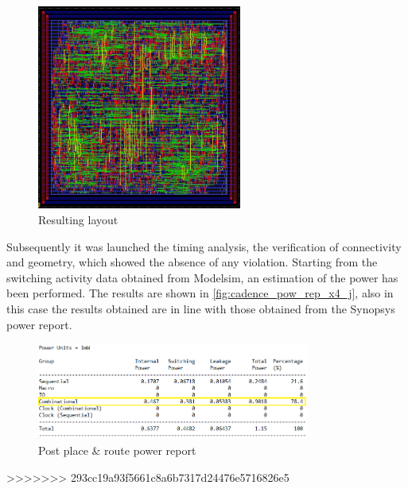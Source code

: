 \begin{figure}[h]
	\center
	\includegraphics[width=0.6\textwidth]{images/IIR_filter_period_min_x4_place_j.jpg}
	\caption{Resulting layout}
	\label{fig:layout_j}
\end{figure}

Subsequently it was launched the timing analysis, the verification of connectivity and geometry, which showed the absence of any violation. Starting from the switching activity data obtained from Modelsim, an estimation of the power has been performed. The results are shown in \autoref{fig:cadence_pow_rep_x4_j}, also in this case the results obtained are in line with those obtained from the Synopsys power report.

\begin{figure}[h]
	\center
	\includegraphics[width=0.8\textwidth]{images/rep_power_x4_cadence_j_mod.png}
	\caption{Post place \& route power report}
	\label{fig:cadence_pow_rep_x4_j}
\end{figure}
>>>>>>> 293cc19a93f5661c8a6b7317d24476e5716826e5
